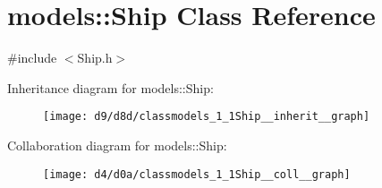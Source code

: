 \hypertarget{classmodels_1_1Ship}{\section{models\-:\-:\-Ship \-Class \-Reference}
\label{d0/d37/classmodels_1_1Ship}
}


{\ttfamily \#include $<$\-Ship.\-h$>$}



\-Inheritance diagram for models\-:\-:\-Ship\-:
\nopagebreak
\begin{figure}[H]
\begin{center}
\leavevmode
\texttt{[image: d9/d8d/classmodels\_1\_1Ship\_\_inherit\_\_graph]}
\end{center}
\end{figure}


\-Collaboration diagram for models\-:\-:\-Ship\-:
\nopagebreak
\begin{figure}[H]
\begin{center}
\leavevmode
\texttt{[image: d4/d0a/classmodels\_1\_1Ship\_\_coll\_\_graph]}
\end{center}
\end{figure}
